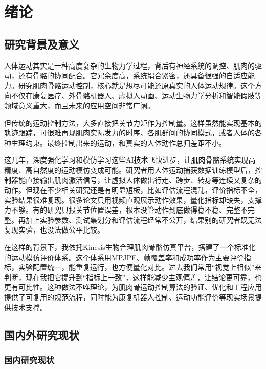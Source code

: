 
\chapter{绪论}\label{ux7eeaux8bba}

\section{研究背景及意义}\label{ux7814ux7a76ux80ccux666fux53caux610fux4e49}

人体运动其实是一种高度复杂的生物力学过程，背后有神经系统的调控、肌肉的驱动，还有骨骼的协同配合。它冗余度高，系统耦合紧密，还具备很强的自适应能力。研究肌肉骨骼运动控制，核心就是想尽可能还原真实的人体运动规律。这个方向不仅在康复医疗、外骨骼机器人、虚拟人动画、运动生物力学分析和智能假肢等领域意义重大，而且未来的应用空间非常广阔\cite{ref01}。

但传统的运动控制方法，大多直接把关节力矩作为控制量。这样虽然能实现基本的轨迹跟踪，可很难再现肌肉实际发力的时序、各肌群间的协同模式，或者人体的各种生理约束。最终控制出来的运动，和真实的人体动作总归差距不小\cite{ref02}。

这几年，深度强化学习和模仿学习这些AI技术飞快进步，让肌肉骨骼系统实现高精度、高自然度的运动模仿变成可能\cite{ref24}。研究者用人体运动捕获数据训练模型后，控制器能直接输出肌肉激活信号，让虚拟人体做出行走、跨步、转身等连续又复杂的动作\cite{ref08}。但现在不少相关研究还是有明显短板，比如评估流程混乱，评价指标不全，实验结果很难复现。很多论文只用视频直观展示动作效果，量化指标却缺失，支撑力不够。有的研究只报关节位置误差，根本没管动作到底做得稳不稳、完整不完整。再加上实验参数、测试集划分和评估流程经常不公开，结果别的研究者既无法复现实验，也没法做公平比较。

在这样的背景下，我依托Kinesis生物合理肌肉骨骼仿真平台，搭建了一个标准化的运动模仿评价体系。这个体系用MPJPE、帧覆盖率和成功率作为主要评价指标，实验配置统一，能重复运行，也方便量化对比。过去我们常用“视觉上相似”来判断，现在我把它提升到“指标上一致”，这样能减少主观偏差，让结论更可靠，也更有可比性。这种做法不唯理论，为肌肉骨运动控制算法的验证、优化和工程应用提供了可复用的规范流程，同时能为康复机器人控制、运动功能评价等现实场景提供技术支撑。

\section{国内外研究现状}\label{ux56fdux5185ux5916ux7814ux7a76ux73b0ux72b6}

\subsection{国内研究现状}


